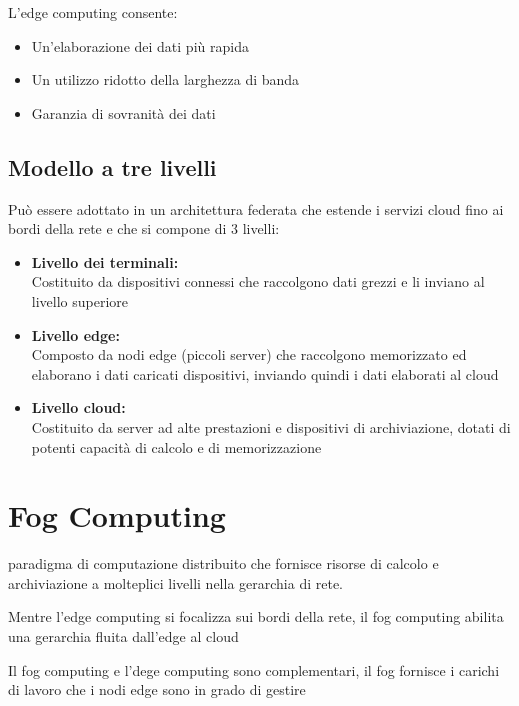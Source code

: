 L'edge computing consente:
\begin{itemize}
    \item Un'elaborazione dei dati più rapida
    \item Un utilizzo ridotto della larghezza di banda
    \item Garanzia di sovranità dei dati
\end{itemize}

\subsection{Modello a tre livelli}
Può essere adottato in un architettura federata che estende i servizi cloud fino ai bordi della rete e che si compone di 3 livelli:
\begin{itemize}
    \item \textbf{Livello dei terminali:}\\
    Costituito da dispositivi connessi che raccolgono dati grezzi e li inviano al livello superiore
    \item \textbf{Livello edge:}\\
    Composto da nodi edge (piccoli server) che raccolgono memorizzato ed elaborano i dati caricati dispositivi, inviando quindi i dati elaborati al cloud
    \item \textbf{Livello cloud:}\\
    Costituito da server ad alte prestazioni e dispositivi di archiviazione, dotati di potenti capacità di calcolo e di memorizzazione
\end{itemize}

\section{Fog Computing}
paradigma di computazione distribuito che fornisce risorse di calcolo e archiviazione a molteplici livelli nella gerarchia di rete.

Mentre l'edge computing si focalizza sui bordi della rete, il fog computing abilita una gerarchia fluita dall'edge al cloud

Il fog computing e l'dege computing sono complementari, il fog fornisce i carichi di lavoro che i nodi edge sono in grado di gestire